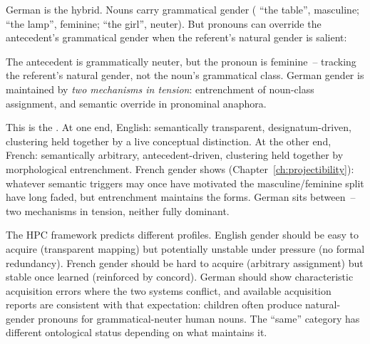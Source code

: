 German is the hybrid. Nouns carry grammatical gender ( \enquote{the table}, masculine;  \enquote{the lamp}, feminine;  \enquote{the girl}, neuter). But pronouns can override the antecedent's grammatical gender when the referent's natural gender is salient:

\z

\noindent The antecedent  is grammatically neuter, but the pronoun  is feminine~-- tracking the referent's natural gender, not the noun's grammatical class. German gender is maintained by \emph{two mechanisms in tension}: entrenchment of noun-class assignment, and semantic override in pronominal anaphora.

This is the . At one end, English: semantically transparent, designatum-driven, clustering held together by a live conceptual distinction. At the other end, French: semantically arbitrary, antecedent-driven, clustering held together by morphological entrenchment. French gender shows  (Chapter~\ref{ch:projectibility}): whatever semantic triggers may once have motivated the masculine/feminine split have long faded, but entrenchment maintains the forms. German sits between~-- two mechanisms in tension, neither fully dominant.

The HPC framework predicts different profiles. English gender should be easy to acquire (transparent mapping) but potentially unstable under pressure (no formal redundancy). French gender should be hard to acquire (arbitrary assignment) but stable once learned (reinforced by concord). German should show characteristic acquisition errors where the two systems conflict, and available acquisition reports are consistent with that expectation: children often produce natural-gender pronouns for grammatical-neuter human nouns. The \enquote{same} category has different ontological status depending on what maintains it.

